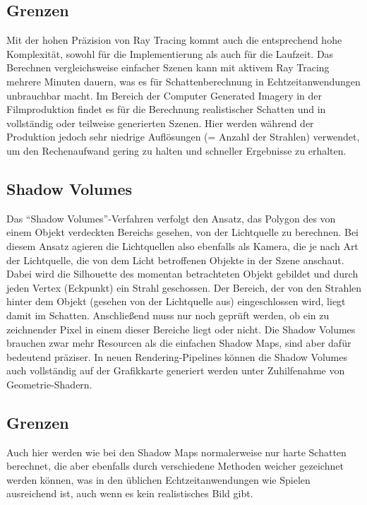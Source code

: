 \subsection*{Grenzen}

Mit der hohen Präzision von Ray Tracing kommt auch die entsprechend hohe Komplexität, sowohl für die
Implementierung als auch für die Laufzeit. Das Berechnen vergleichsweise einfacher Szenen kann mit
aktivem Ray Tracing mehrere Minuten dauern, was es für Schattenberechnung in Echtzeitanwendungen
unbrauchbar macht. Im Bereich der Computer Generated Imagery in der Filmproduktion findet es für die
Berechnung realistischer Schatten und in vollständig oder teilweise generierten Szenen. Hier werden
während der Produktion jedoch sehr niedrige Auflösungen (= Anzahl der Strahlen) verwendet, um den
Rechenaufwand gering zu halten und schneller Ergebnisse zu erhalten.

\subsection{Shadow Volumes}

Das "`Shadow Volumes"'-Verfahren verfolgt den Ansatz, das Polygon des von einem Objekt verdeckten Bereichs
gesehen, von der Lichtquelle zu berechnen. Bei diesem Ansatz agieren die Lichtquellen also ebenfalls als
Kamera, die je nach Art der Lichtquelle, die von dem Licht betroffenen Objekte in der Szene anschaut.
Dabei wird die Silhouette des momentan betrachteten Objekt gebildet und durch jeden Vertex (Eckpunkt)
ein Strahl geschossen. Der Bereich, der von den Strahlen hinter dem Objekt (gesehen von der Lichtquelle
aus) eingeschlossen wird, liegt damit im Schatten. Anschließend muss nur noch geprüft werden, ob ein zu
zeichnender Pixel in einem dieser Bereiche liegt oder nicht. Die Shadow Volumes brauchen zwar mehr
Resourcen als die einfachen Shadow Maps, sind aber dafür bedeutend präziser. In neuen Rendering-Pipelines
können die Shadow Volumes auch vollständig auf der Grafikkarte generiert werden unter Zuhilfenahme von
Geometrie-Shadern.

\subsection*{Grenzen}

Auch hier werden wie bei den Shadow Maps normalerweise nur harte Schatten berechnet, die aber ebenfalls
durch verschiedene Methoden weicher gezeichnet werden können, was in den üblichen Echtzeitanwendungen wie
Spielen ausreichend ist, auch wenn es kein realistisches Bild gibt.
